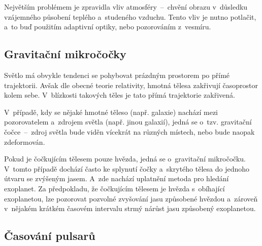 \documentclass[a4paper,12pt]{article}
\begin{document}
{{{Největším problémem je zpravidla vliv atmosféry~--~chvění obrazu v~důsledku vzájemného působení teplého a~studeného vzduchu. Tento vliv je nutno potlačit, a~to buď použitím adaptivní optiky, nebo pozorováním z~vesmíru.~\cite{methods}


\vspace{-10pt}
\subsection{Gravitační mikročočky}

Světlo má obvykle tendenci se pohybovat prázdným prostorem po přímé trajektorii. Avšak dle obecné teorie relativity, hmotná tělesa zakřivují časoprostor kolem sebe. V~blízkosti takových těles je tato přímá trajektorie zakřivená.~\cite{methods}


{}

V~případě, kdy se nějaké hmotné těleso (např. galaxie) nachází mezi pozorovatelem a~zdrojem světla (např. jinou galaxií), jedná se o~tzv. gravitační čočce~--~zdroj světla bude viděn vícekrát na různých místech, nebo bude naopak zdeformován.~\cite{methods}


Pokud je čočkujícím tělesem pouze hvězda, jedná se o~gravitační mikročočku. V~tomto případě dochází často ke splynutí čočky a~skrytého tělesa do jednoho útvaru se zvýšeným jasem. A~zde nachází uplatnění metoda pro hledání exoplanet. Za předpokladu, že čočkujícím tělesem je hvězda s~obíhající exoplanetou, lze pozorovat pozvolné zvyšování jasu způsobené hvězdou a~zároveň v~nějakém krátkém časovém intervalu strmý nárůst jasu způsobený exoplanetou.~\cite{methods}

\subsection{Časování pulsarů}

}}}
\end{document}
